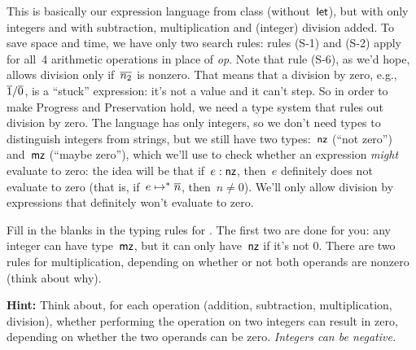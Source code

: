 \documentclass{article}
\begin{document}
{
  \centering
  \def \MathparLineskip {\lineskip=0.43cm}
}

This is basically our expression language {\elang} from class
(without~$\mathsf{let}$), but with only integers and with subtraction,
multiplication and (integer) division added.
%
To save space and time, we have only two search rules: rules (S-1) and
(S-2) apply for all~4 arithmetic operations in place of \textit{op}.
%
Note that rule (S-6), as we'd hope, allows division only if~$\overline{n_2}$ is
nonzero.
%
That means that a division by zero, e.g.,~$\overline{1} / \overline{0}$, is a ``stuck''
expression: it's not a value and it can't step.
%
So in order to make Progress and Preservation hold, we need a type system
that rules out division by zero.
%
The {\ezlang} language has only integers, so we don't need types to
distinguish integers from strings, but we still have two
types:~$\mathsf{nz}$ (``not zero'') and~$\mathsf{mz}$ (``maybe zero''), which we'll use to
check whether an expression {\em might} evaluate to zero: the idea will be
that if~$e : \mathsf{nz}$, then~$e$ definitely does not evaluate to zero
(that is, if~$e \mapsto^* \overline{n}$, then~$n \neq 0$).
%
We'll only allow division by expressions that definitely won't evaluate to
zero.

\begin{task}
  Fill in the blanks in the typing rules for {\ezlang}.
  The first two are done for you: any integer can have type~$\mathsf{mz}$, but
  it can only have~$\mathsf{nz}$ if it's not 0.
  There are two rules for multiplication, depending on whether or not both
  operands are nonzero (think about why).

  \textbf{Hint:} Think about, for each operation (addition, subtraction,
  multiplication, division), whether performing the
  operation on two integers
  can result in zero, depending on whether the two operands can be zero.
  {\em Integers can be negative.}

\end{task}
\end{document}
